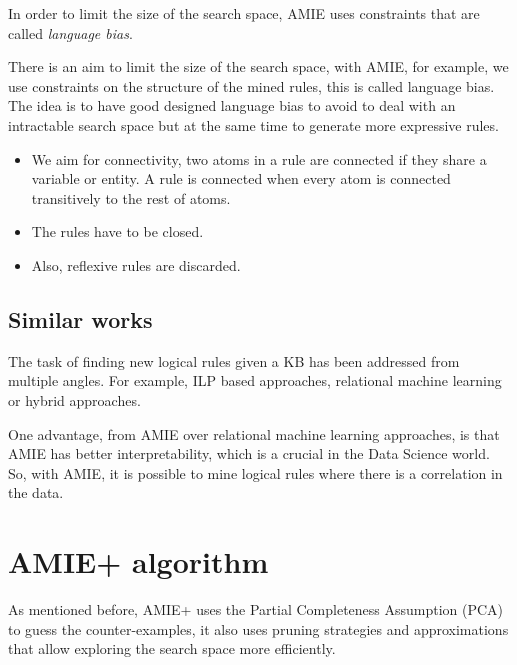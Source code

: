 \documentclass{article}
\begin{document}
In order to limit the size of the search space, AMIE uses constraints that are called
\textit{language bias}.


There is an aim to limit the size of the search space, with AMIE, for example,
we use constraints on the structure of the mined rules, this is called language
bias. The idea is to have good designed language bias to avoid to deal with an
intractable search space but at the same time to generate more expressive rules.

\begin{itemize}
    \item We aim for connectivity, two atoms in a rule are connected if they share a variable or
entity. A rule is connected when every atom is connected transitively to the
rest of atoms.
    \item The rules have to be closed.
    \item Also, reflexive rules are discarded.
\end{itemize}

\subsection{Similar works}

The task of finding new logical rules given a KB has been addressed from
multiple angles. For example, ILP based approaches, relational machine learning
or hybrid approaches.

One advantage, from AMIE over relational machine learning approaches, is that
AMIE has better interpretability, which is a crucial in the Data Science world.
So, with AMIE, it is possible to mine logical rules where there is a
correlation in the data.

\section{AMIE+ algorithm}


As mentioned before, AMIE+ uses the Partial Completeness Assumption (PCA) to
guess the counter-examples, it also uses pruning strategies and approximations
that allow exploring the search space more efficiently. 
\end{document}

